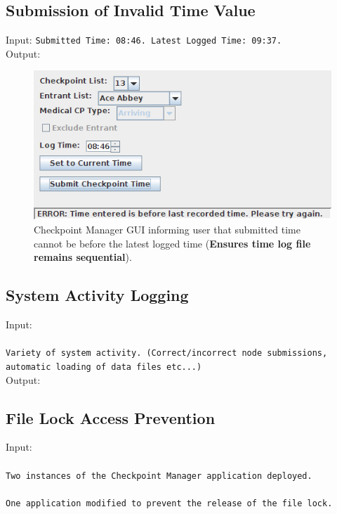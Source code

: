 \documentclass[a4paper, 10pt]{article}
\begin{document}
\clearpage
\subsection{Submission of Invalid Time Value}

Input: \verb+Submitted Time: 08:46. Latest Logged Time: 09:37.+ \\

Output:
\begin{figure}[ht!]
\centering
\includegraphics[scale=0.7]{cm-timesubmitfailure.png}
\caption{Checkpoint Manager GUI informing user that submitted time cannot be before the latest logged time (\textbf{Ensures time log file remains sequential}).}
\end{figure}

\subsection{System Activity Logging}

Input:\\\\
\verb+Variety of system activity. (Correct/incorrect node submissions,+\\
\verb+automatic loading of data files etc...)+\\

Output:


\clearpage
\subsection{File Lock Access Prevention}

Input:\\\\
\verb+Two instances of the Checkpoint Manager application deployed.+ \\\\
\verb+One application modified to prevent the release of the file lock.+\\
\end{document}
